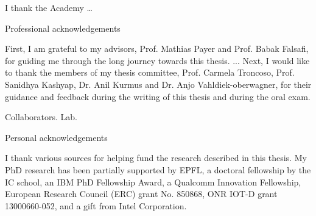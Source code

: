 I thank the Academy \dots

Professional acknowledgements

First, I am grateful to my advisors, Prof. Mathias Payer and Prof. Babak Falsafi,
for guiding me through the long journey towards this thesis.
...
Next, I would like to thank the members of my thesis committee, 
Prof. Carmela Troncoso, 
Prof. Sanidhya Kashyap,
Dr. Anil Kurmus and 
Dr. Anjo Vahldiek-oberwagner,
for their guidance and feedback during the writing of this thesis
and during the oral exam.

Collaborators.
Lab.

Personal acknowledgements


I thank various sources for helping fund the research described in this thesis.
My PhD research has been partially supported by 
EPFL, 
a doctoral fellowship by the IC school,
an IBM PhD Fellowship Award,
a Qualcomm Innovation Fellowship,
European Research Council (ERC) grant No. 850868,
ONR IOT-D grant 13000660-052, and
a gift from Intel Corporation.
